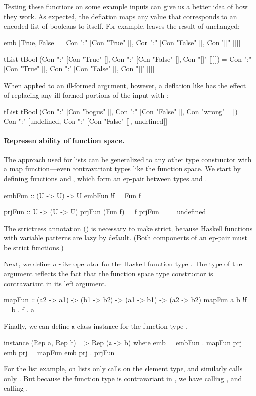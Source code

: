 Testing these functions on some example inputs can give us a better idea of how they work. As expected, the deflation  maps any value that corresponds to an encoded list of booleans to itself. For example,  leaves the result of  unchanged:
%
\begin{hscode}
emb [True, False] =
  Con ":" [Con "True" [], Con ":" [Con "False" [], Con "[]" []]]
\end{hscode}
\unmedskip
\begin{hscode}
tList tBool
 (Con ":" [Con "True" [], Con ":" [Con "False" [], Con "[]" []]])
 = Con ":" [Con "True" [], Con ":" [Con "False" [], Con "[]" []]]
\end{hscode}
%
When applied to an ill-formed argument, however, a deflation like  has the effect of replacing any ill-formed portions of the input with :
\begin{hscode}
tList tBool
  (Con ":" [Con "bogus" [],
            Con ":" [Con "False" [], Con "wrong" []]])
  = Con ":" [undefined, Con ":" [Con "False" [], undefined]]
\end{hscode}

\paragraph{Representability of function space.} The approach used for lists can be generalized to any other type constructor with a map function---even contravariant types like the function space. We start by defining functions  and , which form an ep-pair between types  and .
%
\begin{hscode}
embFun :: (U -> U) -> U
embFun !f = Fun f

prjFun :: U -> (U -> U)
prjFun (Fun f) = f
prjFun _ = undefined
\end{hscode}
%
The strictness annotation () is necessary to make  strict, because Haskell functions with variable patterns are lazy by default. (Both components of an ep-pair must be strict functions.)

Next, we define a -like operator for the Haskell function type \hs{(->)}. The type of the argument  reflects the fact that the function space type constructor is contravariant in its left argument.
%
\begin{hscode}
mapFun :: (a2 -> a1) -> (b1 -> b2) -> (a1 -> b1) -> (a2 -> b2)
mapFun a b !f = b . f . a
\end{hscode}
%
Finally, we can define a class instance for the function type .
%
\begin{hscode}
instance (Rep a, Rep b) => Rep (a -> b) where
  emb = embFun . mapFun prj emb
  prj = mapFun emb prj . prjFun
\end{hscode}
%
For the list example,  on lists only calls  on the element type, and similarly  calls only . But because the function type  is contravariant in , we have  calling , and  calling .

